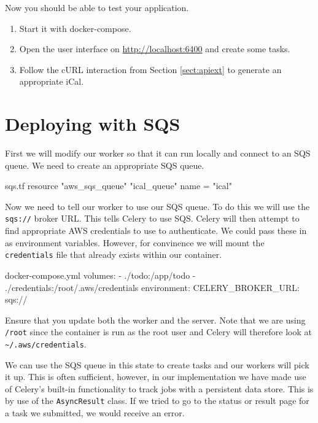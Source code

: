 \documentclass{csse4400}
\begin{document}
Now you should be able to test your application.
\begin{enumerate}
    \item Start it with docker-compose.
    \item Open the user interface on \url{http://localhost:6400} and create some tasks.
    \item Follow the cURL interaction from Section \ref{sect:apiext} to generate an appropriate iCal.
\end{enumerate}

\section{Deploying with SQS}

First we will modify our worker so that it can run locally and connect to an SQS queue.
We need to create an appropriate SQS queue.

\begin{code}[language=terraform,numbers=none]{sqs.tf}
resource "aws_sqs_queue" "ical_queue" {
    name = "ical"
}
\end{code}


Now we need to tell our worker to use our SQS queue.
To do this we will use the \texttt{sqs://} broker URL.
This tells Celery to use SQS.
Celery will then attempt to find appropriate AWS credentials to use to authenticate.
We could pass these in as environment variables.
However, for convinence we will mount the \texttt{credentials} file that already exists within our container.

\begin{code}[numbers=none]{docker-compose.yml}
volumes:
  - ./todo:/app/todo
  - ./credentials:/root/.aws/credentials
environment:
  CELERY_BROKER_URL: sqs://
\end{code}

Ensure that you update both the worker and the server.
Note that we are using \texttt{/root} since the container is run as the root user and Celery will therefore look at \texttt{\textasciitilde/.aws/credentials}.

We can use the SQS queue in this state to create tasks and our workers will pick it up.
This is often sufficient,
however, in our implementation we have made use of Celery's built-in functionality to track jobs with a persistent data store.
This is by use of the \texttt{AsyncResult} class.
If we tried to go to the status or result page for a task we submitted, we would receive an error.
\end{document}
